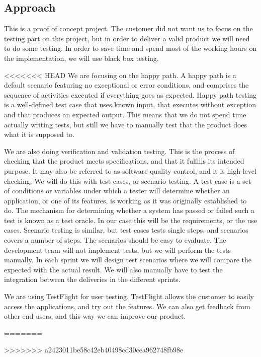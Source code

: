 \subsection{Approach}

This is a proof of concept project. The customer did not want us to focus on the testing part on this project, but in order to deliver a valid product we will need to do some testing. In order to save time and spend most of the working hours on the implementation, we will use black box testing.  

<<<<<<< HEAD
We are focusing on the happy path. A happy path is a default scenario featuring no exceptional or error conditions, and comprises the sequence of activities executed if everything goes as expected. Happy path testing is a well-defined test case that uses known input, that executes without exception and that produces an expected output. This means that we do not spend time actually writing tests, but still we have to manually test that the product does what it is supposed to.

We are also doing verification and validation testing. 
This is the process of checking that the product meets specifications, and that it fulfills its intended purpose. It may also be referred to as software quality control, and it is high-level checking. 
We will do this with test cases, or scenario testing. 
A test case is a set of conditions or variables under which a tester will determine whether an application, or one of its features, is working as it was originally established to do. 
The mechanism for determining whether a system has passed or failed such a test is known as a test oracle. 
In our case this will be the requirements, or the use cases. Scenario testing is similar, but test cases tests single steps, and scenarios covers a number of steps. 
The scenarios should be easy to evaluate. 
The development team will not implement tests, but we will  perform the tests manually. 
In each sprint we will design test scenarios where we will compare the expected with the actual result.
We will also manually have to test the integration between the deliveries in the different sprints. 

We are using TestFlight for user testing. TestFlight allows the customer to easily access the applications, and try out the features. We can also get feedback from other end-users, and this way we can improve our product.  

=======
               
>>>>>>> a2423011be58c42eb40498cd30cea962748fb98e
